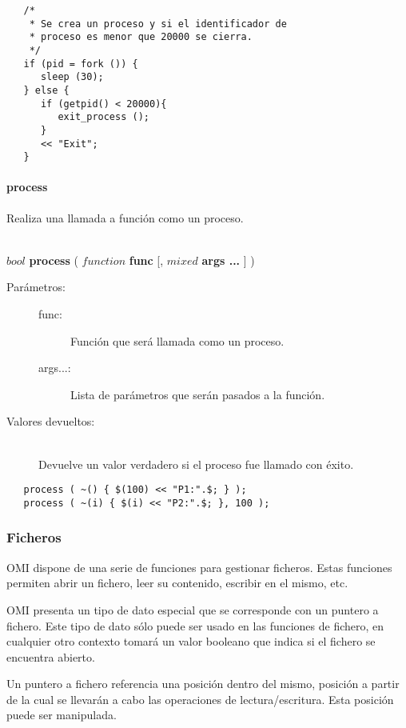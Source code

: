 \begin{lstlisting}  
   /*
    * Se crea un proceso y si el identificador de
    * proceso es menor que 20000 se cierra.
    */
   if (pid = fork ()) {
      sleep (30);
   } else {
      if (getpid() < 20000){
         exit_process ();
      }
      << "Exit";
   }
\end{lstlisting}

\paragraph{process}
Realiza una llamada a función como un proceso.

\begin{framed}
\hfill \\ $bool$ \textbf{process} ( $function$ \textbf{func} [, $mixed$ \textbf{args ...} ]  )  
\begin{description}
\item [Parámetros:] \hfill 
   \begin{description}
   \item[func:] Función que será llamada como un proceso.
   \item[args...:] Lista de parámetros que serán pasados a la función.
   \end{description}
\item[Valores devueltos:] \hfill \\
   Devuelve un valor verdadero si el proceso fue llamado con éxito.
\end{description}
\end{framed}

\begin{lstlisting}  
   process ( ~() { $(100) << "P1:".$; } );
   process ( ~(i) { $(i) << "P2:".$; }, 100 );  
\end{lstlisting}

\subsubsection{Ficheros}
OMI dispone de una serie de funciones para gestionar ficheros. Estas funciones permiten
abrir un fichero, leer su contenido, escribir en el mismo, etc.

OMI presenta un tipo de dato especial que se corresponde con un puntero a fichero. Este tipo 
de  dato sólo puede ser usado en las funciones de fichero, en cualquier otro contexto 
tomará un valor booleano que indica si el fichero se encuentra abierto. 

Un puntero a fichero referencia una posición dentro del mismo, posición a partir de la cual 
se llevarán a cabo las operaciones de lectura/escritura. Esta posición puede ser manipulada.

